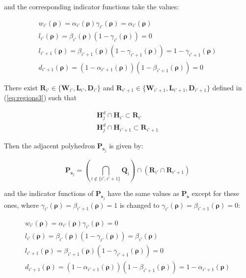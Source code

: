\documentclass[11pt]{article}
\numberwithin{equation}{section}
\numberwithin{figure}{section}
\numberwithin{table}{section}
\begin{document}
\noindent and the corresponding indicator functions take the values:

\begin{equation}
\begin{array}{l}
w_{i'}(\boldsymbol\rho)=\alpha_{i'}(\boldsymbol\rho)\gamma_{i'}(\boldsymbol\rho)=\alpha_{i'}(\boldsymbol\rho)\\
l_{i'}(\boldsymbol\rho)=\beta_{i'}(\boldsymbol\rho)(1-\gamma_{i'}(\boldsymbol\rho))=0\\
l_{i'+1}(\boldsymbol\rho)=\beta_{i'+1}(\boldsymbol\rho)(1-\gamma_{i'+1}(\boldsymbol\rho))=1-\gamma_{i'+1}(\boldsymbol\rho)\\
d_{i'+1}(\boldsymbol\rho)=(1-\alpha_{i'+1}(\boldsymbol\rho))(1-\beta_{i'+1}(\boldsymbol\rho))=0
\end{array}
\label{eq:modeSearch5}
\end{equation}

\noindent There exist $\textbf{R}_{i'} \in \{\textbf{W}_{i'}, \textbf{L}_{i'}, \textbf{D}_{i'}\}$ and $\textbf{R}_{i'+1} \in \{\textbf{W}_{i'+1}, \textbf{L}_{i'+1}, \textbf{D}_{i'+1}\}$ defined in (\ref{eq:regions3}) such that

\begin{equation}
\begin{array}{l}
\textbf{H}^{d}_{j}\cap \textbf{H}_{i'}\subset \textbf{R}_{i'}\\
\textbf{H}^{d}_{j}\cap \textbf{H}_{i'+1}\subset \textbf{R}_{i'+1}
\end{array}
\label{eq:modeSearch6}
\end{equation}

\noindent Then the adjacent polyhedron $\textbf{P}_{\boldsymbol s_{j}}$ is given by:

\begin{equation}
\textbf{P}_{\boldsymbol s_{j}}=(\bigcap_{i\notin\{i', i'+1\}} \textbf{Q}_{i})\cap (\textbf{R}_{i'}\cap\textbf{R}_{i'+1})
\label{eq:modeSearch7}
\end{equation}

\noindent and the indicator functions of $\textbf{P}_{\boldsymbol s_{j}}$ have the same values as $\textbf{P}_{\boldsymbol s}$ except for these ones, where $\gamma_{i'}(\boldsymbol\rho)=\beta_{i'+1}(\boldsymbol\rho)=1$ is changed to $\gamma_{i'}(\boldsymbol\rho)=\beta_{i'+1}(\boldsymbol\rho)=0$:

\begin{equation}
\begin{array}{l}
w_{i'}(\boldsymbol\rho)=\alpha_{i'}(\boldsymbol\rho)\gamma_{i'}(\boldsymbol\rho)=0\\
l_{i'}(\boldsymbol\rho)=\beta_{i'}(\boldsymbol\rho)(1-\gamma_{i'}(\boldsymbol\rho))=\beta_{i'}(\boldsymbol\rho)\\
l_{i'+1}(\boldsymbol\rho)=\beta_{i'+1}(\boldsymbol\rho)(1-\gamma_{i'+1}(\boldsymbol\rho))=0\\
d_{i'+1}(\boldsymbol\rho)=(1-\alpha_{i'+1}(\boldsymbol\rho))(1-\beta_{i'+1}(\boldsymbol\rho))=1-\alpha_{i'+1}(\boldsymbol\rho)
\end{array}
\label{eq:modeSearch8}
\end{equation}
\end{document}
